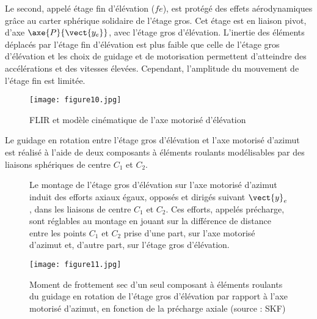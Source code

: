 
Le second, appelé étage fin d'élévation ($fe$), est protégé
des effets aérodynamiques grâce au carter sphérique
solidaire de l'étage gros. Cet étage est en liaison pivot,
d'axe $\axe{P}{\vect{y_e}}$, avec l'étage gros d'élévation. L'inertie des
éléments déplacés par l'étage fin d'élévation est plus faible
que celle de l'étage gros d'élévation et les choix de guidage
et de motorisation permettent d'atteindre des accélérations
et des vitesses élevées. Cependant, l'amplitude du mouvement de l'étage fin est limitée.

\begin{figure}[!htb]
\begin{center}
\texttt{[image: figure10.jpg]}
\caption{FLIR et modèle cinématique de l'axe motorisé d'élévation \label{figure10}}
\end{center}
\end{figure}

Le guidage en rotation entre l'étage gros d'élévation et l'axe motorisé d'azimut est réalisé à l'aide de deux
composants à éléments roulants modélisables par des liaisons sphériques de centre $C_1$ et $C_2$.

\begin{figure}[!htb]
\begin{center}
\begin{minipage}{0.45\textwidth}

Le montage de l'étage gros d'élévation sur l'axe motorisé
d'azimut induit des efforts axiaux égaux, opposés
et dirigés suivant $\vect{y}_e$, dans les liaisons de centre
$C_1$ et $C_2$. Ces efforts, appelés précharge, sont réglables
au montage en jouant sur la différence de distance
entre les points $C_1$ et $C_2$ prise d'une part, sur
l'axe motorisé d'azimut et, d'autre part, sur l'étage
gros d'élévation.
\end{minipage}
\begin{minipage}{0.45\textwidth}
\begin{center}
\texttt{[image: figure11.jpg]}
\caption{Moment de frottement sec d'un seul composant
à éléments roulants du guidage en rotation de l'étage
gros d'élévation par rapport à l'axe motorisé d'azimut, en
fonction de la précharge axiale (source : SKF)\label{fig11}}
\end{center}
\end{minipage}
\end{center}
\end{figure}

